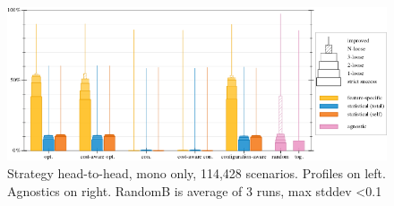 \begin{figure}[t]
  \includegraphics[width=\columnwidth]{data/strategy-overall.pdf}
  \caption{Strategy head-to-head, mono only, 114,428 scenarios. Profiles on left. Agnostics on right. RandomB is average of 3 runs, max stddev <0.1}
  \label{f:strategy-overall}
\end{figure}

\clearpage


